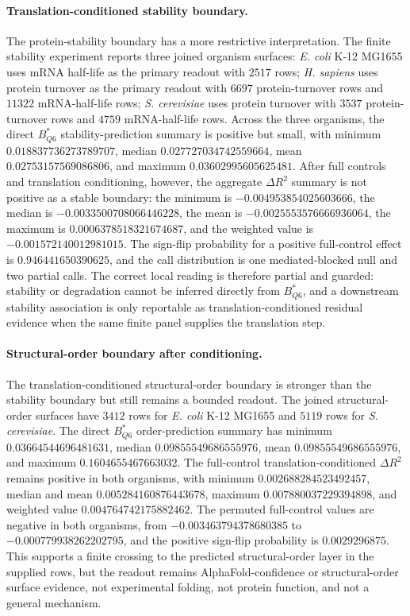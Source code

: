 \paragraph{Translation-conditioned stability boundary.}
The protein-stability boundary has a more restrictive interpretation.  The finite stability experiment reports three joined organism surfaces: \emph{E. coli} K-12 MG1655 uses mRNA half-life as the primary readout with $2517$ rows; \emph{H. sapiens} uses protein turnover as the primary readout with $6697$ protein-turnover rows and $11322$ mRNA-half-life rows; \emph{S. cerevisiae} uses protein turnover with $3537$ protein-turnover rows and $4759$ mRNA-half-life rows.  Across the three organisms, the direct $B^*_{Q6}$ stability-prediction summary is positive but small, with minimum $0.018837736273789707$, median $0.027727034742559664$, mean $0.02753157569086806$, and maximum $0.03602995605625481$.  After full controls and translation conditioning, however, the aggregate $\Delta R^2$ summary is not positive as a stable boundary: the minimum is $-0.004953854025603666$, the median is $-0.0033500708066446228$, the mean is $-0.0025553576666936064$, the maximum is $0.0006378518321674687$, and the weighted value is $-0.001572140012981015$.  The sign-flip probability for a positive full-control effect is $0.946441650390625$, and the call distribution is one mediated-blocked null and two partial calls.  The correct local reading is therefore partial and guarded: stability or degradation cannot be inferred directly from $B^*_{Q6}$, and a downstream stability association is only reportable as translation-conditioned residual evidence when the same finite panel supplies the translation step.

\paragraph{Structural-order boundary after conditioning.}
The translation-conditioned structural-order boundary is stronger than the stability boundary but still remains a bounded readout.  The joined structural-order surfaces have $3412$ rows for \emph{E. coli} K-12 MG1655 and $5119$ rows for \emph{S. cerevisiae}.  The direct $B^*_{Q6}$ order-prediction summary has minimum $0.03664544696481631$, median $0.09855549686555976$, mean $0.09855549686555976$, and maximum $0.1604655467663032$.  The full-control translation-conditioned $\Delta R^2$ remains positive in both organisms, with minimum $0.002688284523492457$, median and mean $0.005284160876443678$, maximum $0.007880037229394898$, and weighted value $0.004764742175882462$.  The permuted full-control values are negative in both organisms, from $-0.003463794378680385$ to $-0.000779938262202795$, and the positive sign-flip probability is $0.0029296875$.  This supports a finite crossing to the predicted structural-order layer in the supplied rows, but the readout remains AlphaFold-confidence or structural-order surface evidence, not experimental folding, not protein function, and not a general mechanism.

